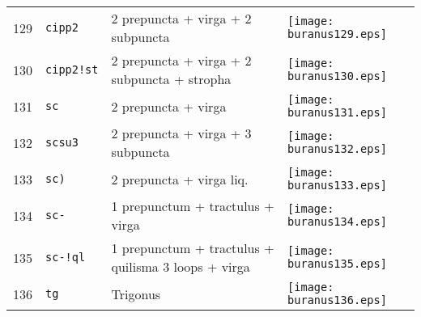\documentclass{scrarticle}
\begin{document}
\begin{longtable}{l|l|l|l}
129 & \texttt{cipp2} & 2 prepuncta + virga + 2 subpuncta & \texttt{[image: buranus129.eps]} \\
130 & \texttt{cipp2!st} & 2 prepuncta + virga + 2 subpuncta + stropha & \texttt{[image: buranus130.eps]} \\
131 & \texttt{sc} & 2 prepuncta + virga & \texttt{[image: buranus131.eps]} \\
132 & \texttt{scsu3} & 2 prepuncta + virga + 3 subpuncta & \texttt{[image: buranus132.eps]} \\
133 & \texttt{sc)} & 2 prepuncta + virga liq. & \texttt{[image: buranus133.eps]} \\
134 & \texttt{sc-} & 1 prepunctum + tractulus + virga & \texttt{[image: buranus134.eps]} \\
135 & \texttt{sc-!ql} & 1 prepunctum + tractulus + quilisma 3 loops + virga & \texttt{[image: buranus135.eps]} \\
136 & \texttt{tg} & Trigonus & \texttt{[image: buranus136.eps]} \\\end{longtable}
\end{document}

